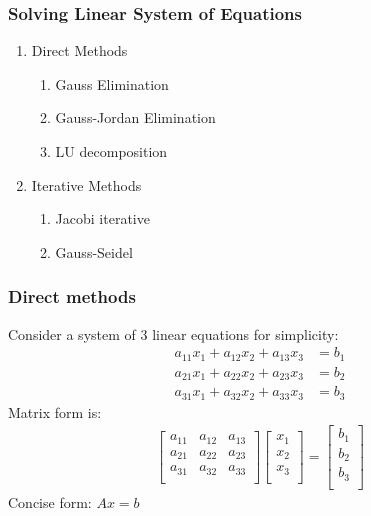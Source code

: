 \documentclass[notes]{beamer}
\begin{document}
\begin{frame}
	\frametitle{Solving Linear System of Equations}
	\begin{enumerate}
		\item Direct Methods
		\begin{enumerate}
			\item Gauss Elimination
			\item Gauss-Jordan Elimination
			\item LU decomposition
		\end{enumerate}
		\item Iterative Methods
		\begin{enumerate}
			\item Jacobi iterative
			\item Gauss-Seidel
		\end{enumerate}
	\end{enumerate}
\end{frame}

\begin{frame}
	\frametitle{Direct methods}
	Consider a system of 3 linear equations for simplicity:
	\begin{align*}
	a_{11} x_1 + a_{12} x_2 + a_{13} x_3 & = b_1 \\
	a_{21} x_1 + a_{22} x_2 + a_{23} x_3 & = b_2 \\
	a_{31} x_1 + a_{32} x_2 + a_{33} x_3 & = b_3
	\end{align*}
	Matrix form is:
	\begin{align*}
		\begin{bmatrix}
		a_{11} & a_{12} & a_{13} \\
		a_{21} & a_{22} & a_{23} \\
		a_{31} & a_{32} & a_{33} \\
		\end{bmatrix}
		\begin{bmatrix}
		x_1 \\
		x_2 \\
		x_3 \\
		\end{bmatrix} = 
		\begin{bmatrix}
		b_1 \\
		b_2 \\
		b_3 \\
		\end{bmatrix}
	\end{align*}
	Concise form: $A x = b$
	
\end{frame}
\end{document}
